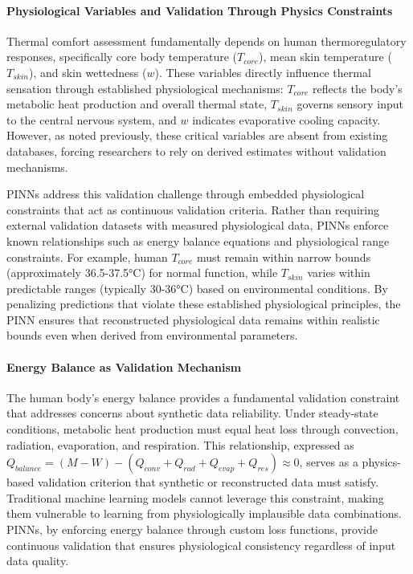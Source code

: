 \paragraph{Physiological Variables and Validation Through Physics Constraints} Thermal comfort assessment fundamentally depends on human thermoregulatory responses, specifically core body temperature ($T_{core}$), mean skin temperature ($T_{skin}$), and skin wettedness ($w$). These variables directly influence thermal sensation through established physiological mechanisms: $T_{core}$ reflects the body's metabolic heat production and overall thermal state, $T_{skin}$ governs sensory input to the central nervous system, and $w$ indicates evaporative cooling capacity. However, as noted previously, these critical variables are absent from existing databases, forcing researchers to rely on derived estimates without validation mechanisms.

PINNs address this validation challenge through embedded physiological constraints that act as continuous validation criteria. Rather than requiring external validation datasets with measured physiological data, PINNs enforce known relationships such as energy balance equations and physiological range constraints. For example, human $T_{core}$ must remain within narrow bounds (approximately 36.5-37.5°C) for normal function, while $T_{skin}$ varies within predictable ranges (typically 30-36°C) based on environmental conditions. By penalizing predictions that violate these established physiological principles, the PINN ensures that reconstructed physiological data remains within realistic bounds even when derived from environmental parameters.

\paragraph{Energy Balance as Validation Mechanism} The human body's energy balance provides a fundamental validation constraint that addresses concerns about synthetic data reliability. Under steady-state conditions, metabolic heat production must equal heat loss through convection, radiation, evaporation, and respiration. This relationship, expressed as $Q_{balance} = (M - W) - (Q_{conv} + Q_{rad} + Q_{evap} + Q_{res}) \approx 0$, serves as a physics-based validation criterion that synthetic or reconstructed data must satisfy. Traditional machine learning models cannot leverage this constraint, making them vulnerable to learning from physiologically implausible data combinations. PINNs, by enforcing energy balance through custom loss functions, provide continuous validation that ensures physiological consistency regardless of input data quality.


